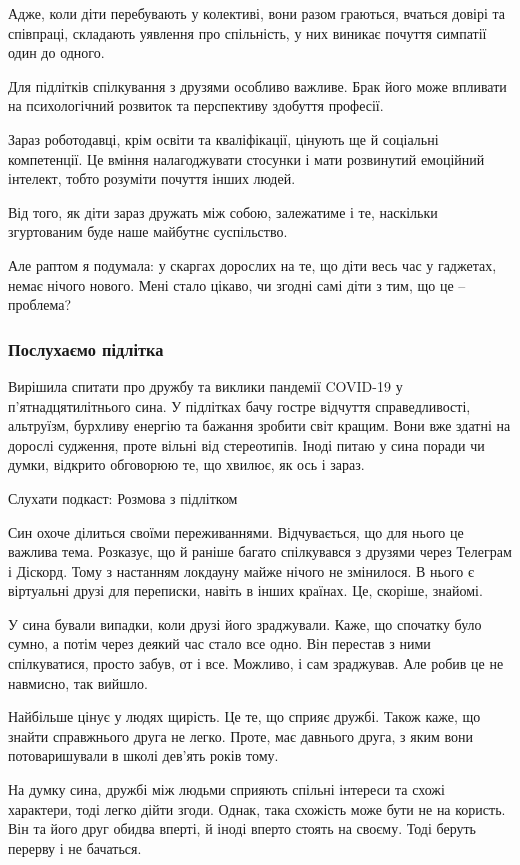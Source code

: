 Адже, коли діти перебувають у колективі, вони разом граються, вчаться довірі та
співпраці, складають уявлення про спільність, у них виникає почуття симпатії
один до одного.

Для підлітків спілкування з друзями особливо важливе. Брак його може впливати
на психологічний розвиток та перспективу здобуття професії.

Зараз роботодавці, крім освіти та кваліфікації, цінують ще й соціальні
компетенції. Це вміння налагоджувати стосунки і мати розвинутий емоційний
інтелект, тобто розуміти почуття інших людей.

Від того, як діти зараз дружать між собою, залежатиме і те, наскільки
згуртованим буде наше майбутнє суспільство.

Але раптом я подумала: у скаргах дорослих на те, що діти весь час у гаджетах,
немає нічого нового. Мені стало цікаво, чи згодні самі діти з тим, що це –
проблема?

\subsubsection{Послухаємо підлітка}

Вирішила спитати про дружбу та виклики пандемії COVID-19 у п’ятнадцятилітнього
сина. У підлітках бачу гостре відчуття справедливості, альтруїзм, бурхливу
енергію та бажання зробити світ кращим. Вони вже здатні на дорослі судження,
проте вільні від стереотипів. Іноді питаю у сина поради чи думки, відкрито
обговорюю те, що хвилює, як ось і зараз.

Слухати подкаст: Розмова з підлітком

Син охоче ділиться своїми переживаннями. Відчувається, що для нього це важлива
тема. Розказує, що й раніше багато спілкувався з друзями через Телеграм і
Діскорд. Тому з настанням локдауну майже нічого не змінилося. В нього є
віртуальні друзі для переписки, навіть в інших країнах. Це, скоріше, знайомі.

У сина бували випадки, коли друзі його зраджували. Каже, що спочатку було
сумно, а потім через деякий час стало все одно. Він перестав з ними
спілкуватися, просто забув, от і все. Можливо, і сам зраджував. Але робив це не
навмисно, так вийшло.

Найбільше цінує у людях щирість. Це те, що сприяє дружбі. Також каже, що знайти
справжнього друга не легко. Проте, має давнього друга, з яким вони
потоваришували в школі дев’ять років тому.

На думку сина, дружбі між людьми сприяють спільні інтереси та схожі характери,
тоді легко дійти згоди. Однак, така схожість може бути не на користь. Він та
його друг обидва вперті, й іноді вперто стоять на своєму. Тоді беруть перерву і
не бачаться.

